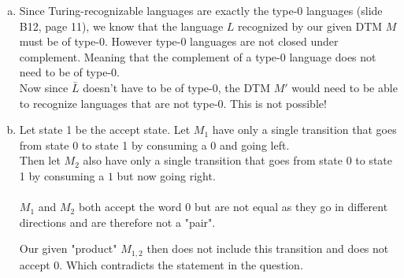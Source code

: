 \documentclass{article} %
\begin{document}
\begin{enumerate}[(a)]
\item
Since Turing-recognizable languages are exactly the type-0 languages (slide B12, page 11), we know that the language $L$ recognized by our given DTM $M$ must be of type-0. However type-0 languages are not closed under complement. Meaning that the complement of a type-0 language does not need to be of type-0.\\
Now since $\bar{L}$ doesn't have to be of type-0, the DTM $M'$ would need to be able to recognize languages that are not type-0. This is not possible!

\item
Let state 1 be the accept state.
Let $M_1$ have only a single transition that goes from state 0 to state 1 by consuming a $0$ and going left.\\
Then let $M_2$ also have only a single transition that goes from state 0 to state 1 by consuming a $1$ but now going right.\\\\
$M_1$ and $M_2$ both accept the word $0$ but are not equal as they go in different directions and are therefore not a "pair".

Our given "product" $M_{1,2}$ then does not include this transition and does not accept $0$. Which contradicts the statement in the question.
\end{enumerate}

\clearpage
\end{document}
